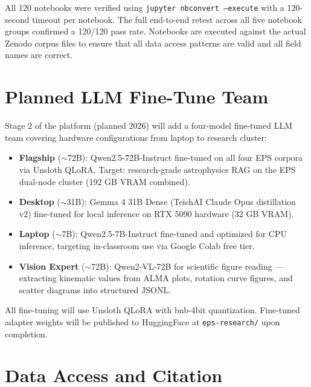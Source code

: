 \documentclass[twocolumn]{aastex631}
\begin{document}
All 120 notebooks were verified using \texttt{jupyter nbconvert --execute}
with a 120-second timeout per notebook. The full end-to-end retest across
all five notebook groups confirmed a 120/120 pass rate. Notebooks are
executed against the actual Zenodo corpus files to ensure that all
data access patterns are valid and all field names are correct.

\section{Planned LLM Fine-Tune Team}
\label{sec:llms}

Stage 2 of the platform (planned 2026) will add a four-model fine-tuned
LLM team covering hardware configurations from laptop to research cluster:

\begin{itemize}
\item \textbf{Flagship} ($\sim$72B): Qwen2.5-72B-Instruct fine-tuned on
      all four EPS corpora via Unsloth QLoRA. Target: research-grade
      astrophysics RAG on the EPS dual-node cluster (192 GB VRAM combined).
\item \textbf{Desktop} ($\sim$31B): Gemma 4 31B Dense (TeichAI Claude
      Opus distillation v2) fine-tuned for local inference on RTX 5090
      hardware (32 GB VRAM).
\item \textbf{Laptop} ($\sim$7B): Qwen2.5-7B-Instruct fine-tuned and
      optimized for CPU inference, targeting in-classroom use via
      Google Colab free tier.
\item \textbf{Vision Expert} ($\sim$72B): Qwen2-VL-72B for scientific
      figure reading --- extracting kinematic values from ALMA plots,
      rotation curve figures, and scatter diagrams into structured JSONL.
\end{itemize}

All fine-tuning will use Unsloth QLoRA with bnb-4bit quantization.
Fine-tuned adapter weights will be published to HuggingFace at
\texttt{eps-research/} upon completion.

\section{Data Access and Citation}
\label{sec:data}
\end{document}
